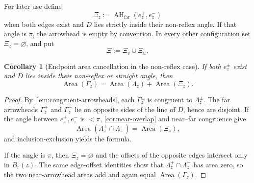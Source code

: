 \documentclass[11pt]{article}
\newtheorem{corollary}[theorem]{Corollary}
\newcommand{\Area}{\operatorname{Area}}
\newcommand{\AHfar}{\operatorname{AH}_{\mathrm{far}}}
\numberwithin{equation}{section}
\begin{document}
For later use define
\begin{equation}\label{eq:Xi-def}
\Xi_z:=\AHfar(e_z^+,e_z^-)
\end{equation}
when both edges exist and $D$ lies strictly inside their non-reflex angle. If that angle is $\pi$, the arrowhead is empty by convention. In every other configuration set $\Xi_z=\varnothing$, and put
\[
\Xi:=\Xi_v\cup\Xi_w.
\]

\begin{corollary}[Endpoint area cancellation in the non-reflex case]\label{cor:endpoint-cancellation}
If both $e_z^\pm$ exist and $D$ lies inside their non-reflex or straight angle, then
\[
\boxed{
\Area(\Gamma_z)
=
\Area(\Lambda_z)+\Area(\Xi_z).
}
\]
\end{corollary}

\begin{proof}
By \cref{lem:congruent-arrowheads}, each $\Gamma_z^\pm$ is congruent to $\Lambda_z^\pm$. The far arrowheads $\Gamma_z^+$ and $\Gamma_z^-$ lie on opposite sides of the line of $D$, hence are disjoint. If the angle between $e_z^+,e_z^-$ is $<\pi$, \cref{cor:near-overlap} and near--far congruence give
\[
\Area(\Lambda_z^+\cap\Lambda_z^-)=\Area(\Xi_z),
\]
and inclusion-exclusion yields the formula.

If the angle is $\pi$, then $\Xi_z=\varnothing$ and the offsets of the opposite edges intersect only in $B_r(z)$. The same edge-offset identities show that $\Lambda_z^+\cap\Lambda_z^-$ has area zero, so the two near-arrowhead areas add and again equal $\Area(\Gamma_z)$.
\end{proof}
\end{document}
